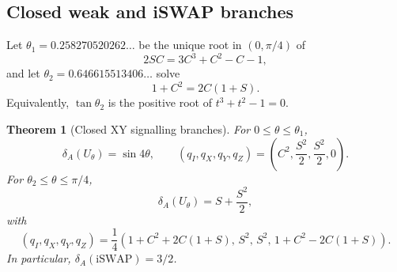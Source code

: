 \documentclass[11pt,a4paper]{article}
\newtheorem{theorem}{Theorem}
\theoremstyle{remark}
\begin{document}
\subsection{Closed weak and iSWAP branches}

Let $\theta_1=0.258270520262\ldots$ be the unique root in
$(0,\pi/4)$ of
\begin{equation}
 2SC=3C^3+C^2-C-1,
 \label{eq:xy-first-threshold}
\end{equation}
and let $\theta_2=0.646615513406\ldots$ solve
\begin{equation}
 1+C^2=2C(1+S).
 \label{eq:xy-second-threshold}
\end{equation}
Equivalently, $\tan\theta_2$ is the positive root of $t^3+t^2-1=0$.

\begin{theorem}[Closed XY signalling branches]
\label{thm:xy}
For $0\leq\theta\leq\theta_1$,
\begin{equation}
 \delta_A(U_\theta)=\sin4\theta,
 \qquad (q_I,q_X,q_Y,q_Z)
 =\left(C^2,\frac{S^2}{2},\frac{S^2}{2},0\right).
 \label{eq:xy-weak}
\end{equation}
For $\theta_2\leq\theta\leq\pi/4$,
\begin{equation}
 \delta_A(U_\theta)=S+\frac{S^2}{2},
 \label{eq:xy-strong}
\end{equation}
with
\begin{equation}
 (q_I,q_X,q_Y,q_Z)=\frac14
 \left(1+C^2+2C(1+S),\,S^2,\,S^2,\,
       1+C^2-2C(1+S)\right).
 \label{eq:xy-strong-channel}
\end{equation}
In particular, $\delta_A(\mathrm{iSWAP})=3/2$.
\end{theorem}
\end{document}

